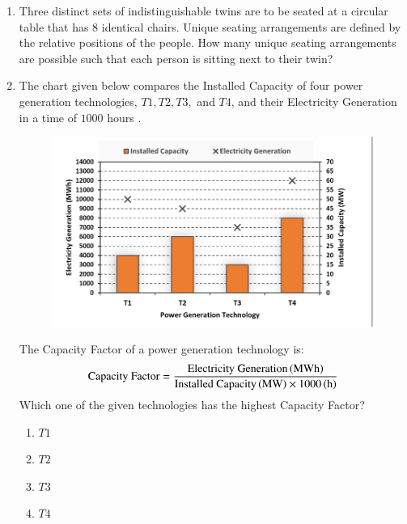 \documentclass[journal,12pt,onecolumn]{IEEEtran}
\theoremstyle{remark}
\begin{document}
\begin{enumerate}
		\item Three distinct sets of indistinguishable twins are to be seated at a circular table that has $8$ identical chairs. Unique seating arrangements are defined by the relative positions of the people. How many unique seating arrangements are possible such that each person is sitting next to their twin?
		
		\hfill{}
		\begin{enumerate}
		\end{enumerate}
		
		\item The chart given below compares the Installed Capacity  of four power generation technologies, $T1, T2, T3,$ and $T4$, and their Electricity Generation  in a time of $1000$ hours \brak{\text{h}}.
		\begin{figure}
			\includegraphics[width = 0.8\columnwidth]{q8}
			\caption*{}
			\label{fig:q8}
		\end{figure}
		The Capacity Factor of a power generation technology is:
		$$ \text{Capacity Factor} = \frac{\text{Electricity Generation}\left(\text{MWh}\right)}{\text{Installed Capacity}\left(\text{MW}\right)\times1000\left(\text{h}\right)} $$
		Which one of the given technologies has the highest Capacity Factor?
		
		\hfill{\brak{\text{GATE CH 2024}}}
		\begin{enumerate}
			\item $T1$
			\item $T2$
			\item $T3$
			\item $T4$
		\end{enumerate}
		

\end{enumerate}
\end{document}
